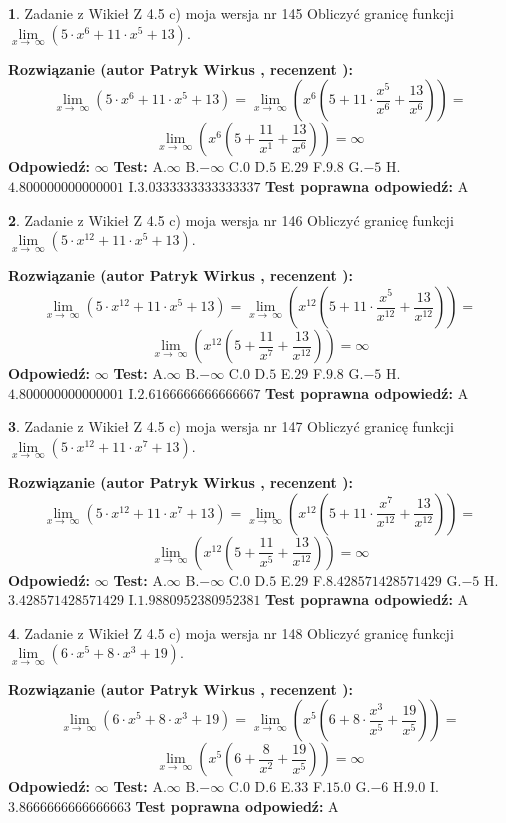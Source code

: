 \documentclass[12pt, a4paper]{article}
\theoremstyle{definition} %
\newtheorem{zad}{}
\newcommand{\zadStart}[1]{\begin{zad}#1\newline}
\newcommand{\zadStop}{\end{zad}}
\newcommand{\rozwStart}[2]{\noindent \textbf{Rozwiązanie (autor #1 , recenzent #2): }\newline}
\newcommand{\rozwStop}{\newline}
\newcommand{\odpStart}{\noindent \textbf{Odpowiedź:}\newline}
\newcommand{\odpStop}{\newline}
\newcommand{\testStart}{\noindent \textbf{Test:}\newline}
\newcommand{\testStop}{\newline}
\newcommand{\kluczStart}{\noindent \textbf{Test poprawna odpowiedź:}\newline}
\newcommand{\kluczStop}{\newline}
\begin{document}
\zadStart{Zadanie z Wikieł Z 4.5 c) moja wersja nr 145}
Obliczyć granicę funkcji  $\lim\limits_{x\to\ \infty}(5 \cdot x^{6}+11 \cdot x^{5}+13)$.
\zadStop
\rozwStart{Patryk Wirkus}{}
$$\lim\limits_{x\to\ \infty}(5 \cdot x^{6}+11 \cdot x^{5}+13) = \lim\limits_{x\to\ \infty}(x^{6}(5 +11 \cdot \frac{x^{5}}{x^{6}}+\frac{13}{x^{6}})) =$$ $$\lim\limits_{x\to\ \infty}(x^{6}(5 +\frac{11}{x^{1}}+\frac{13}{x^{6}})) =\infty$$
\rozwStop
\odpStart
$\infty$
\odpStop
\testStart
A.$\infty$ B.$-\infty$ C.$0$ D.$5$ E.$29$
F.$9.8$ G.$-5$
H.$4.800000000000001$
I.$3.0333333333333337$
\testStop
\kluczStart
A
\kluczStop



\zadStart{Zadanie z Wikieł Z 4.5 c) moja wersja nr 146}
Obliczyć granicę funkcji  $\lim\limits_{x\to\ \infty}(5 \cdot x^{12}+11 \cdot x^{5}+13)$.
\zadStop
\rozwStart{Patryk Wirkus}{}
$$\lim\limits_{x\to\ \infty}(5 \cdot x^{12}+11 \cdot x^{5}+13) = \lim\limits_{x\to\ \infty}(x^{12}(5 +11 \cdot \frac{x^{5}}{x^{12}}+\frac{13}{x^{12}})) =$$ $$\lim\limits_{x\to\ \infty}(x^{12}(5 +\frac{11}{x^{7}}+\frac{13}{x^{12}})) =\infty$$
\rozwStop
\odpStart
$\infty$
\odpStop
\testStart
A.$\infty$ B.$-\infty$ C.$0$ D.$5$ E.$29$
F.$9.8$ G.$-5$
H.$4.800000000000001$
I.$2.6166666666666667$
\testStop
\kluczStart
A
\kluczStop



\zadStart{Zadanie z Wikieł Z 4.5 c) moja wersja nr 147}
Obliczyć granicę funkcji  $\lim\limits_{x\to\ \infty}(5 \cdot x^{12}+11 \cdot x^{7}+13)$.
\zadStop
\rozwStart{Patryk Wirkus}{}
$$\lim\limits_{x\to\ \infty}(5 \cdot x^{12}+11 \cdot x^{7}+13) = \lim\limits_{x\to\ \infty}(x^{12}(5 +11 \cdot \frac{x^{7}}{x^{12}}+\frac{13}{x^{12}})) =$$ $$\lim\limits_{x\to\ \infty}(x^{12}(5 +\frac{11}{x^{5}}+\frac{13}{x^{12}})) =\infty$$
\rozwStop
\odpStart
$\infty$
\odpStop
\testStart
A.$\infty$ B.$-\infty$ C.$0$ D.$5$ E.$29$
F.$8.428571428571429$ G.$-5$
H.$3.428571428571429$
I.$1.9880952380952381$
\testStop
\kluczStart
A
\kluczStop



\zadStart{Zadanie z Wikieł Z 4.5 c) moja wersja nr 148}
Obliczyć granicę funkcji  $\lim\limits_{x\to\ \infty}(6 \cdot x^{5}+8 \cdot x^{3}+19)$.
\zadStop
\rozwStart{Patryk Wirkus}{}
$$\lim\limits_{x\to\ \infty}(6 \cdot x^{5}+8 \cdot x^{3}+19) = \lim\limits_{x\to\ \infty}(x^{5}(6 +8 \cdot \frac{x^{3}}{x^{5}}+\frac{19}{x^{5}})) =$$ $$\lim\limits_{x\to\ \infty}(x^{5}(6 +\frac{8}{x^{2}}+\frac{19}{x^{5}})) =\infty$$
\rozwStop
\odpStart
$\infty$
\odpStop
\testStart
A.$\infty$ B.$-\infty$ C.$0$ D.$6$ E.$33$
F.$15.0$ G.$-6$
H.$9.0$
I.$3.8666666666666663$
\testStop
\kluczStart
A
\kluczStop
\end{document}

